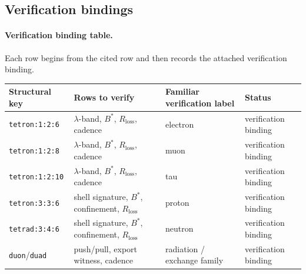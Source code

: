 \subsection{Verification bindings}\label{app:familiar-bindings}
\paragraph{Verification binding table.} Each row begins from the cited row and then records the attached verification binding.

\begin{center}
\begin{tabularx}{\linewidth}{@{}lXXl@{}}
\toprule
Structural key & Rows to verify & Familiar verification label & Status \\
\midrule
\texttt{tetron:1:2:6} & $\lambda$-band, $B^*$, $R_{\mathrm{loss}}$, cadence & electron & verification binding \\
\texttt{tetron:1:2:8} & $\lambda$-band, $B^*$, $R_{\mathrm{loss}}$, cadence & muon & verification binding \\
\texttt{tetron:1:2:10} & $\lambda$-band, $B^*$, $R_{\mathrm{loss}}$, cadence & tau & verification binding \\
\texttt{tetron:3:3:6} & shell signature, $B^*$, confinement, $R_{\mathrm{loss}}$ & proton & verification binding \\
\texttt{tetrad:3:4:6} & shell signature, $B^*$, confinement, $R_{\mathrm{loss}}$ & neutron & verification binding \\
\texttt{duon}/\texttt{duad} & push/pull, export witness, cadence & radiation / exchange family & verification binding \\
\bottomrule
\end{tabularx}
\end{center}
